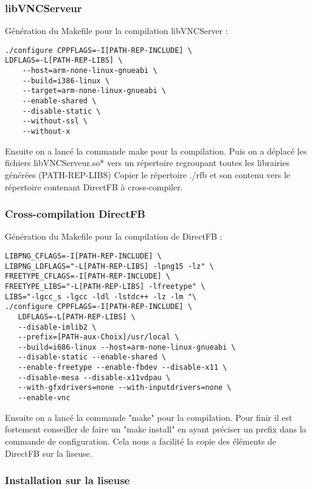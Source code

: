 \subsubsection{libVNCServeur}

Génération du Makefile pour la compilation libVNCServer :

\begin{lstlisting}
./configure CPPFLAGS=-I[PATH-REP-INCLUDE] \
LDFLAGS=-L[PATH-REP-LIBS] \  
	--host=arm-none-linux-gnueabi \
	--build=i386-linux \
	--target=arm-none-linux-gnueabi \ 
	--enable-shared \
	--disable-static \
	--without-ssl \
	--without-x
\end{lstlisting}

Ensuite on a lancé la commande make pour la compilation.
Puis on a déplacé les fichiers libVNCServeur.so* vers un répertoire regroupant toutes les librairies générées (PATH-REP-LIBS)
Copier le répertoire ./rfb et son contenu vers le répertoire contenant DirectFB à cross-compiler.

\subsubsection{Cross-compilation DirectFB}

Génération du Makefile pour la compilation de DirectFB :

\begin{lstlisting}
LIBPNG_CFLAGS=-I[PATH-REP-INCLUDE] \
LIBPNG_LDFLAGS="-L[PATH-REP-LIBS] -lpng15 -lz" \
FREETYPE_CFLAGS=-I[PATH-REP-INCLUDE] \
FREETYPE_LIBS="-L[PATH-REP-LIBS] -lfreetype" \
LIBS="-lgcc_s -lgcc -ldl -lstdc++ -lz -lm "\
./configure CPPFLAGS=-I[PATH-REP-INCLUDE] \
   LDFLAGS=-L[PATH-REP-LIBS] \
   --disable-imlib2 \
   --prefix=[PATH-aux-Choix]/usr/local \
   --build=i686-linux --host=arm-none-linux-gnueabi \
   --disable-static --enable-shared \
   --enable-freetype --enable-fbdev --disable-x11 \
   --disable-mesa --disable-x11vdpau \
   --with-gfxdrivers=none --with-inputdrivers=none \
   --enable-vnc
\end{lstlisting}

Ensuite on a lancé la commande "make" pour la compilation. Pour finir il est fortement conseiller de faire un "make install" en ayant préciser un prefix dans la commande de configuration. Cela nous a facilité la copie des éléments de DirectFB sur la liseuse. 

\subsubsection{Installation sur la liseuse}


